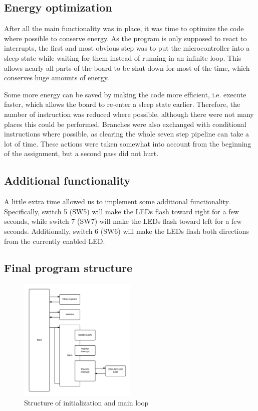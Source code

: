 \subsection{Energy optimization}

After all the main functionality was in place, it was time to optimize the code where possible to conserve energy. As the program is only supposed to react to interrupts, the first and most obvious step was to put the microcontroller into a sleep state while waiting for them instead of running in an infinite loop. This allows nearly all parts of the board to be shut down for most of the time, which conserves huge amounts of energy.

Some more energy can be saved by making the code more efficient, i.e. execute faster, which allows the board to re-enter a sleep state earlier. Therefore, the number of instruction was reduced where possible, although there were not many places this could be performed. Branches were also exchanged with conditional instructions where possible, as clearing the whole seven step pipeline can take a lot of time. These actions were taken somewhat into account from the beginning of the assignment, but a second pass did not hurt.
\subsection{Additional functionality}

A little extra time allowed us to implement some additional functionality. Specifically, switch 5 (SW5) will make the LEDs flash toward right for a few seconds, while switch 7 (SW7) will make the LEDs flash toward left for a few seconds. Additionally, switch 6 (SW6) will make the LEDs flash both directions from the currently enabled LED.

\subsection{Final program structure}
\begin{figure}[h!]
  \caption{Structure of initialization and main loop}
  \centering
    \includegraphics[width=0.5\textwidth]{mainstructure}
\end{figure}


